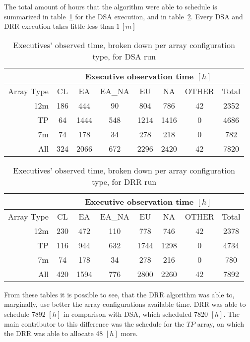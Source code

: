 The total amount of hours that the algorithm were able to schedule is summarized in table~\ref{table:dsa-hours-per-array} for the DSA execution, and in table~\ref{table:drr-hours-per-array}. Every DSA and DRR execution takes little less than $1\,[m]$

\begin{table}[t]
\centering
\begin{tabular}{c|c|c|c|c|c|c|c|} 
\cline{2-8}
 & \multicolumn{7}{c|}{Executive observation time $[h]$} \\ \hline
\multicolumn{1}{|r|}{Array Type} & CL	& EA & EA\_NA &	EU & NA & OTHER & Total \\ \hline
\multicolumn{1}{|r|}{12m} & 186 & 444 & 90 & 804 & 786 & 42 & 2352 \\ \hline
\multicolumn{1}{|r|}{TP} & 64 & 1444 & 548 & 1214 & 1416 & 0 & 4686 \\ \hline
\multicolumn{1}{|r|}{7m} & 74 & 178 & 34 & 278 & 218 & 0 & 782 \\ \hline
\multicolumn{1}{|r|}{All} & 324 & 2066 & 672 & 2296 & 2420 & 42 & 7820 \\ \hline
\end{tabular}
\caption{Executives' observed time, broken down per array configuration type, for DSA run}
\label{table:dsa-hours-per-array}
\end{table}

\begin{table}[t]
\centering
\begin{tabular}{c|c|c|c|c|c|c|c|} 
\cline{2-8}
 & \multicolumn{7}{c|}{Executive observation time $[h]$} \\ \hline
 \multicolumn{1}{|r|}{Array Type} & CL	& EA & EA\_NA &	EU & NA & OTHER & Total \\ \hline
 \multicolumn{1}{|r|}{12m} &	230 & 	472 &	110 &	778 & 	746 &	42 & 2378 \\ \hline
 \multicolumn{1}{|r|}{TP} & 116 & 944 & 632 &	1744 &	1298 & 	0 &	4734 \\ \hline
 \multicolumn{1}{|r|}{7m} & 74	& 178 & 34 & 278 & 216 & 0 & 780 \\ \hline
 \multicolumn{1}{|r|}{All} & 420 & 1594 & 776 & 2800 & 2260 & 42 & 7892 \\ \hline
\end{tabular}
\caption{Executives' observed time, broken down per array configuration type, for DRR run}
\label{table:drr-hours-per-array}
\end{table}

From these tables it is possible to see, that the DRR algorithm was able to, marginally, use better the array configurations available time. DRR was able to schedule 7892 $[h]$ in comparison with DSA, which scheduled 7820 $[h]$. The main contributor to this difference was the schedule for the $TP$ array, on which the DRR was able to allocate 48 $[h]$ more. 

